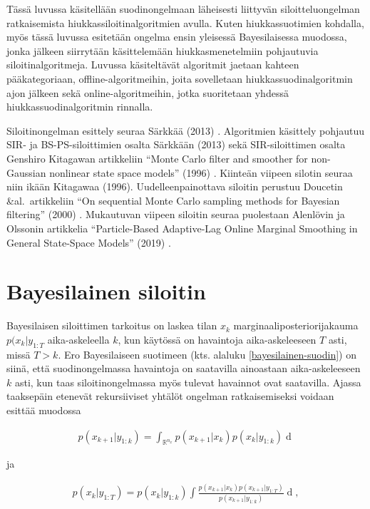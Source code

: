 \documentclass[
  12pt,
  a4paper, twoside]{book}
\begin{document}
Tässä luvussa käsitellään suodinongelmaan läheisesti liittyvän siloitteluongelman ratkaisemista hiukkassiloitinalgoritmien avulla. Kuten hiukkassuotimien kohdalla, myös tässä luvussa esitetään ongelma ensin yleisessä Bayesilaisessa muodossa, jonka jälkeen siirrytään käsittelemään hiukkasmenetelmiin pohjautuvia siloitinalgoritmeja. Luvussa käsiteltävät algoritmit jaetaan kahteen pääkategoriaan, offline-algoritmeihin, joita sovelletaan hiukkassuodinalgoritmin ajon jälkeen sekä online-algoritmeihin, jotka suoritetaan yhdessä hiukkassuodinalgoritmin rinnalla.

Siloitinongelman esittely seuraa Särkkää (2013) \citep{sarkka-2013}. Algoritmien käsittely pohjautuu SIR- ja BS-PS-siloittimien osalta Särkkään (2013) \citep{sarkka-2013} sekä SIR-siloittimen osalta Genshiro Kitagawan artikkeliin ``Monte Carlo filter and smoother for non-Gaussian nonlinear state space models'' (1996) \citep{kitagawa-1996}. Kiinteän viipeen silotin seuraa niin ikään Kitagawaa (1996). Uudelleenpainottava siloitin perustuu Doucetin \&al.~artikkeliin ``On sequential Monte Carlo sampling methods for Bayesian filtering'' (2000) \citep{Doucet-2000}. Mukautuvan viipeen siloitin seuraa puolestaan Alenlövin ja Olssonin artikkelia ``Particle-Based Adaptive-Lag Online Marginal Smoothing in General State-Space Models'' (2019) \citep{alenlov-2019}.

\section{Bayesilainen siloitin}

Bayesilaisen siloittimen tarkoitus on laskea tilan \(x_k\) marginaaliposteriorijakauma \(p(x_k|y_{1:T}\) aika-askeleella \(k\), kun käytössä on havaintoja aika-askeleeseen \(T\) asti, missä \(T>k\). Ero Bayesilaiseen suotimeen (kts. alaluku \ref{bayesilainen-suodin}) on siinä, että suodinongelmassa havaintoja on saatavilla ainoastaan aika-askeleeseen \(k\) asti, kun taas siloitinongelmassa myös tulevat havainnot ovat saatavilla. Ajassa taaksepäin etenevät rekursiiviset yhtälöt ongelman ratkaisemiseksi voidaan esittää muodossa

\begin{align}\label{siloitin-prediktiivinen}
p(x_{k+1}|y_{1:k})=\int_{\mathbb{R}^{n_x}}p(x_{k+1}|x_k)p(x_k|y_{1:k})\mathop{dx_k}
\end{align}

ja

\begin{align}\label{siloitin-ratkaisu}
p(x_k|y_{1:T}) = p(x_k|y_{1:k}) \int \frac{p(x_{k+1}|x_k)p(x_{k+1}|y_{1:T})}{p(x_{k+1}|y_{1:k})} \mathop{dx_{k+1}},
\end{align}
\end{document}
